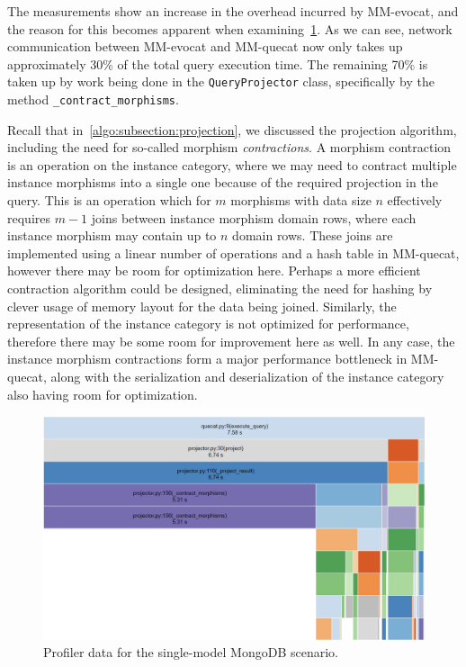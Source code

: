 The measurements show an increase in the overhead incurred by MM-evocat, and the reason for this becomes apparent when examining~\cref{fig:evalmongodbprofile}.
As we can see, network communication between MM-evocat and MM-quecat now only takes up approximately 30\% of the total query execution time.
The remaining 70\% is taken up by work being done in the \texttt{QueryProjector} class, specifically by the method \texttt{\_contract\_morphisms}.

Recall that in~\cref{algo:subsection:projection}, we discussed the projection algorithm, including the need for so-called morphism \textit{contractions}.
A morphism contraction is an operation on the instance category, where we may need to contract multiple instance morphisms into a single one because of the required projection in the query.
This is an operation which for $m$ morphisms with data size $n$ effectively requires $m-1$ joins between instance morphism domain rows, where each instance morphism may contain up to $n$ domain rows.
These joins are implemented using a linear number of operations and a hash table in MM-quecat, however there may be room for optimization here.
Perhaps a more efficient contraction algorithm could be designed, eliminating the need for hashing by clever usage of memory layout for the data being joined.
Similarly, the representation of the instance category is not optimized for performance, therefore there may be some room for improvement here as well.
In any case, the instance morphism contractions form a major performance bottleneck in MM-quecat, along with the serialization and deserialization of the instance category also having room for optimization.

\begin{figure}[h]
\centering
\includegraphics[width=\textwidth]{img/eval-mongodb-profile.png} 
\caption{Profiler data for the single-model MongoDB scenario.}
\label{fig:evalmongodbprofile}
\end{figure}

